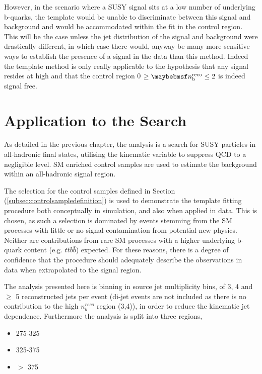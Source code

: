However, in the scenario where a \ac{SUSY} signal sits at a low number of underlying b-quarks, the template would be unable to discriminate between this signal and background and would be accommodated within the fit in the control region. This will be the case unless the jet \pt distribution of the signal and background were drastically different, in which case there would, anyway be many more sensitive ways to establish the presence of a signal in the data than this method. Indeed the template method is only really applicable to the hypothesis that any signal resides at high \nbreco and that the control region 0 $\geq \nbreco \leq 2$ is indeed signal free.  



\section{ Application to the \alphat Search}
\label{sec:templateapplication}

As detailed in the previous chapter, the \alphat analysis is a search for \ac{SUSY} particles in all-hadronic final states, utilising the kinematic variable \alphat to suppress QCD to a negligible level. \ac{SM} enriched control samples are used to estimate the background within an all-hadronic signal region. 

The selection for the \mupjets control samples defined in Section (\ref{subsec:controlsampledefinition}) is used to demonstrate the template fitting procedure both conceptually in simulation, and also when applied in data. This is chosen, as such a selection is dominated by events stemming from the \ac{SM} processes with little or no signal contamination from potential new physics. Neither are contributions from rare \ac{SM} processes with a higher underlying b-quark content (e.g. $t\bar{t}b\bar{b}$) expected. For these reasons, there is a degree of confidence that the procedure should adequately describe the observations in data when extrapolated to the signal region.

The analysis presented here is binning in source jet multiplicity bins, of 3, 4 and $\geq$ 5 reconstructed jets per event (di-jet events are not included as there is no contribution to the high $n_{b}^{reco}$ region (3,4)), in order to reduce the kinematic jet \pt dependence. Furthermore the analysis is split into three \theht regions, 

\begin{itemize}
\item 275-325 \GeV
\item 325-375 \GeV
\item $>$ 375 \GeV
\end{itemize}

